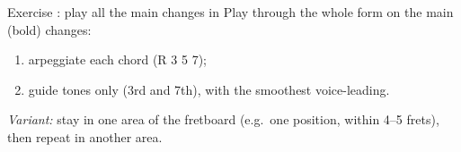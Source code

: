 \begin{study}{Exercise \theexercise: play all the main changes in \tunekeys}
Play through the whole form on the main (bold) changes:
\begin{enumerate}\setlength{\itemsep}{0pt}
\item arpeggiate each chord (R 3 5 7);
\item guide tones only (3rd and 7th), with the smoothest voice-leading.
\end{enumerate}
\keyboxes

\smallskip
\textit{Variant:} stay in one area of the fretboard (e.g.\ one position,
within 4--5 frets), then repeat in another area.
\end{study}
